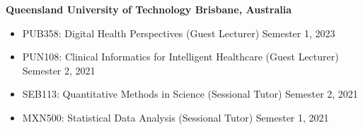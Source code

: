 \textbf{Queensland University of Technology \hfill Brisbane, Australia}\par
\begin{itemize}
	\item PUB358: Digital Health Perspectives (Guest Lecturer) \hfill Semester 1, 2023
	\item PUN108: Clinical Informatics for Intelligent Healthcare (Guest Lecturer) \hfill Semester 2, 2021
	\item SEB113: Quantitative Methods in Science (Sessional Tutor) \hfill Semester 2, 2021
    \item MXN500: Statistical Data Analysis (Sessional Tutor) \hfill Semester 1, 2021 \par
\end{itemize}\par